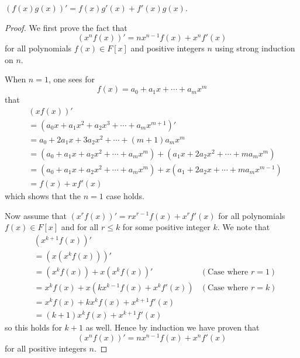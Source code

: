 \begin{proposition}
    $(f(x)g(x))' = f(x)g'(x) + f'(x)g(x)$.
\end{proposition}
\begin{proof}
    We first prove the fact that
    \[
        (x^nf(x))' = nx^{n-1}f(x) + x^nf'(x)
    \]
    for all polynomials $f(x) \in F[x]$ and positive integers $n$ using strong induction on $n$.

    When $n = 1$, one sees for
    \[
        f(x) = a_0 + a_1x + \cdots + a_mx^m
    \]
    that
    \begin{align*}
        &(xf(x))'\\
        &= \left(a_0x + a_1x^2 + a_2x^3 + \cdots + a_mx^{m+1}\right)'\\
        &= a_0 + 2a_1x + 3a_2x^2 + \cdots + (m+1)a_mx^m\\
        &= \left(a_0 + a_1x + a_2x^2 + \cdots + a_mx^m\right) + \left(a_1x + 2a_2x^2 + \cdots + ma_mx^m\right)\\
        &= \left(a_0 + a_1x + a_2x^2 + \cdots + a_mx^m\right) + x\left(a_1 + 2a_2x + \cdots + ma_mx^{m-1}\right)\\
        &= f(x) + xf'(x)
    \end{align*}
    which shows that the $n = 1$ case holds.

    Now assume that $(x^rf(x))' = rx^{r-1}f(x) + x^rf'(x)$ for all polynomials $f(x) \in F[x]$ and for all $r \leq k$ for some positive integer $k$. We note that
    \begin{align*}
        &(x^{k+1}f(x))'\\
        &= \left(x\left(x^kf(x)\right)\right)'\\
        &= \left(x^kf(x)\right) + x\left(x^kf(x)\right)' & (\text{Case where }r=1)\\
        &= x^kf(x) + x\left(kx^{k-1}f(x) + x^kf'(x)\right) & (\text{Case where }r=k)\\
        &= x^kf(x) + kx^kf(x) + x^{k+1}f'(x)\\
        &= (k+1)x^kf(x) + x^{k+1}f'(x)
    \end{align*}
    so this holds for $k + 1$ as well. Hence by induction we have proven that
    \[
        (x^nf(x))' = nx^{n-1}f(x) + x^nf'(x)
    \]
    for all positive integers $n$.


\end{proof}
